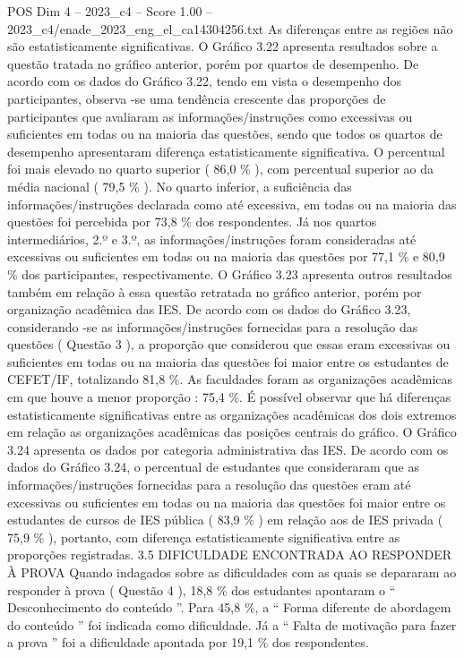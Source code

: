\begin{textsample}{POS Dim 4 – 2023\_c4 – Score 1.00 – 2023\_c4/enade\_2023\_eng\_el\_ca14304256.txt}
As diferenças entre as regiões não são estatisticamente significativas.
O Gráfico 3.22 apresenta resultados sobre a questão tratada no gráfico anterior, porém por quartos de desempenho.
De acordo com os dados do Gráfico 3.22, tendo em vista o desempenho dos participantes, observa -se uma tendência crescente das proporções de participantes que avaliaram as informações/instruções como excessivas ou suficientes em todas ou na maioria das questões, sendo que todos os quartos de desempenho apresentaram diferença estatisticamente significativa.
O percentual foi mais elevado no quarto superior ( 86,0 \% ), com percentual superior ao da média nacional ( 79,5 \% ).
No quarto inferior, a suficiência das informações/instruções declarada como até excessiva, em todas ou na maioria das questões foi percebida por 73,8 \% dos respondentes.
Já nos quartos intermediários, 2.º e 3.º, as informações/instruções foram consideradas até excessivas ou suficientes em todas ou na maioria das questões por 77,1 \% e 80,9 \% dos participantes, respectivamente.
O Gráfico 3.23 apresenta outros resultados também em relação à essa questão retratada no gráfico anterior, porém por organização acadêmica das IES.
De acordo com os dados do Gráfico 3.23, considerando -se as informações/instruções fornecidas para a resolução das questões ( Questão 3 ), a proporção que considerou que essas eram excessivas ou suficientes em todas ou na maioria das questões foi maior entre os estudantes de CEFET/IF, totalizando 81,8 \%.
As faculdades foram as organizações acadêmicas em que houve a menor proporção : 75,4 \%.
É possível observar que há diferenças estatisticamente significativas entre as organizações acadêmicas dos dois extremos em relação as organizações acadêmicas das posições centrais do gráfico.
O Gráfico 3.24 apresenta os dados por categoria administrativa das IES.
De acordo com os dados do Gráfico 3.24, o percentual de estudantes que consideraram que as informações/instruções fornecidas para a resolução das questões eram até excessivas ou suficientes em todas ou na maioria das questões foi maior entre os estudantes de cursos de IES pública ( 83,9 \% ) em relação aos de IES privada ( 75,9 \% ), portanto, com diferença estatisticamente significativa entre as proporções registradas. 3.5 DIFICULDADE ENCONTRADA AO RESPONDER À PROVA Quando indagados sobre as dificuldades com as quais se depararam ao responder à prova ( Questão 4 ), 18,8 \% dos estudantes apontaram o “ Desconhecimento do conteúdo ”.
Para 45,8 \%, a “ Forma diferente de abordagem do conteúdo ” foi indicada como dificuldade.
Já a “ Falta de motivação para fazer a prova ” foi a dificuldade apontada por 19,1 \% dos respondentes.

\end{textsample}
